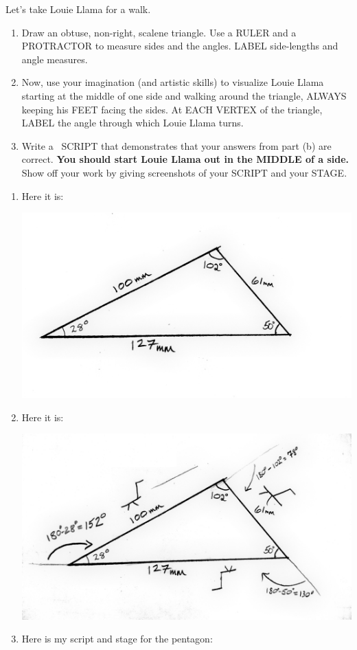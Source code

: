 \documentclass[nooutcomes,noauthor,handout]{ximera}
\begin{document}
\begin{question}
  Let's take Louie Llama for a walk.
  \begin{enumerate}
  \item Draw an obtuse, non-right, scalene triangle. Use a RULER and a
    PROTRACTOR to measure sides and the angles. LABEL side-lengths and
    angle measures.
  \item Now, use your imagination (and artistic skills) to visualize
    Louie Llama starting at the middle of one side and walking around
    the triangle, ALWAYS keeping his FEET facing the sides. At EACH
    VERTEX of the triangle, LABEL the angle through which Louie Llama
    turns.
  \item Write a \snap\ SCRIPT that demonstrates that your answers from
    part (b) are correct. \textbf{You should start Louie Llama out in the
    MIDDLE of a side.}  Show off your work by giving screenshots of
    your SCRIPT and your STAGE.
  \end{enumerate}
  \begin{freeResponse}
    \begin{enumerate}
    \item Here it is:
      \begin{center}
        \includegraphics[width=.4\textwidth]{specificTri.jpg}
      \end{center}
    \item Here it is:
      \begin{center}
        \includegraphics[width=.4\textwidth]{llamaAndSpecificTri.jpg}
      \end{center}
    \item Here is my script and stage for the pentagon:
      \begin{center}

\end{center}
\end{enumerate}
\end{freeResponse}
\end{question}
\end{document}
